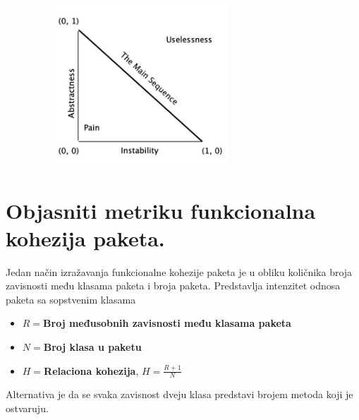 \documentclass[a4paper]{article}
\begin{document}
  \begin{figure}[H]
    \begin{center}
        \includegraphics[width=80mm,height=60mm]{Slike/apstraktnost_i_stabilnost.jpg}
    \end{center}
  \end{figure}

\section{Objasniti metriku funkcionalna kohezija paketa.}
  Jedan način izražavanja funkcionalne kohezije paketa je u obliku količnika broja zavisnosti 
  među klasama paketa i broja paketa. Predstavlja intenzitet odnosa paketa sa sopstvenim klasama
  \begin{itemize}
    \item \textbf{$R = $Broj međusobnih zavisnosti među klasama paketa} 
    \item \textbf{$N = $Broj klasa u paketu}
    \item \textbf{$H = $Relaciona kohezija}, $H = \frac{R+1}{N}$
  \end{itemize}
  Alternativa je da se svaka zavisnost dveju klasa predstavi brojem metoda koji je ostvaruju.
\end{document}
